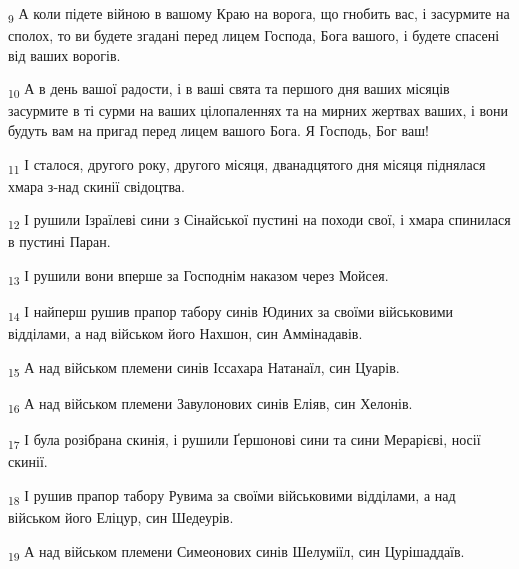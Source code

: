 \begin{tcolorbox}
\textsubscript{9} А коли підете війною в вашому Краю на ворога, що гнобить вас, і засурмите на сполох, то ви будете згадані перед лицем Господа, Бога вашого, і будете спасені від ваших ворогів.
\end{tcolorbox}
\begin{tcolorbox}
\textsubscript{10} А в день вашої радости, і в ваші свята та першого дня ваших місяців засурмите в ті сурми на ваших цілопаленнях та на мирних жертвах ваших, і вони будуть вам на пригад перед лицем вашого Бога. Я Господь, Бог ваш!
\end{tcolorbox}
\begin{tcolorbox}
\textsubscript{11} І сталося, другого року, другого місяця, дванадцятого дня місяця піднялася хмара з-над скинії свідоцтва.
\end{tcolorbox}
\begin{tcolorbox}
\textsubscript{12} І рушили Ізраїлеві сини з Сінайської пустині на походи свої, і хмара спинилася в пустині Паран.
\end{tcolorbox}
\begin{tcolorbox}
\textsubscript{13} І рушили вони вперше за Господнім наказом через Мойсея.
\end{tcolorbox}
\begin{tcolorbox}
\textsubscript{14} І найперш рушив прапор табору синів Юдиних за своїми військовими відділами, а над військом його Нахшон, син Аммінадавів.
\end{tcolorbox}
\begin{tcolorbox}
\textsubscript{15} А над військом племени синів Іссахара Натанаїл, син Цуарів.
\end{tcolorbox}
\begin{tcolorbox}
\textsubscript{16} А над військом племени Завулонових синів Еліяв, син Хелонів.
\end{tcolorbox}
\begin{tcolorbox}
\textsubscript{17} І була розібрана скинія, і рушили Ґершонові сини та сини Мерарієві, носії скинії.
\end{tcolorbox}
\begin{tcolorbox}
\textsubscript{18} І рушив прапор табору Рувима за своїми військовими відділами, а над військом його Еліцур, син Шедеурів.
\end{tcolorbox}
\begin{tcolorbox}
\textsubscript{19} А над військом племени Симеонових синів Шелуміїл, син Цурішаддаїв.
\end{tcolorbox}
